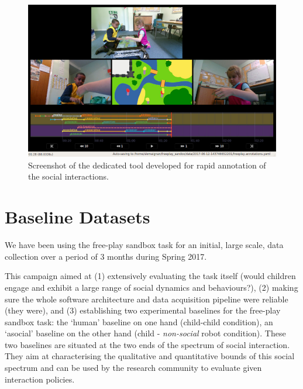 \documentclass[sigconf]{acmart}
\begin{document}
\begin{figure}
    \centering
    \includegraphics[width=\columnwidth]{annotator}
    \caption{Screenshot of the dedicated tool developed for rapid annotation of
    the social interactions.}
    \label{annotator}
\end{figure}


\section{Baseline Datasets}
\label{sec:dataset}

We have been using the free-play sandbox task for an initial, large scale, data
collection over a period of 3 months during Spring 2017.

This campaign aimed at (1) extensively evaluating the task itself (would
children engage and exhibit a large range of social dynamics and behaviours?),
(2) making sure the whole software architecture and data acquisition pipeline
were reliable (they were), and (3) establishing two experimental baselines for
the free-play sandbox task: the `human' baseline on one hand (child-child
condition), an `asocial' baseline on the other hand (child - \emph{non-social}
robot condition). These two baselines are situated at the two ends of the
spectrum of social interaction. They aim at characterising the qualitative and
quantitative bounds of this social spectrum and can be used by the research
community to evaluate given interaction policies.
\end{document}

